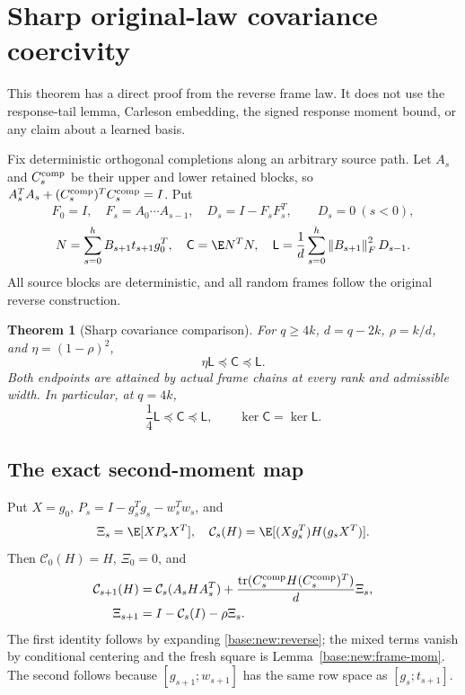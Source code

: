 \documentclass[11pt,oneside,openany,a4paper]{book}
\numberwithin{equation}{chapter}
\newtheorem{theorem}{Theorem}[chapter]
\theoremstyle{definition}
\theoremstyle{remark}
\newcommand{\F}[1]{\left\lVert#1\right\rVert_F}
\DeclareMathOperator{\tr}{tr}\DeclareMathOperator{\rank}{rank}
\newcommand{\Cov}{\mathsf C}\newcommand{\Loss}{\mathsf L}\newcommand{\Fil}{\mathcal F}
\begin{document}
\section{Sharp original-law covariance coercivity}\label{base:new:coercive}
This theorem has a direct proof from the reverse frame law. It does not use the response-tail lemma, Carleson embedding, the signed response moment bound, or any claim about a learned basis.

Fix deterministic orthogonal completions along an arbitrary source path. Let $A_s$ and $C_s^{\rm comp}$ be their upper and lower retained blocks, so
$A_s^TA_s+(C_s^{\rm comp})^TC_s^{\rm comp}=I$. Put
\[
 F_0=I,\quad F_s=A_0\cdots A_{s-1},\quad
 D_s=I-F_sF_s^T,\qquad D_s=0\ (s<0),
\]
\[
 N=\sum_{s=0}^{h}B_{s+1}t_{s+1}g_0^T,\quad
 \Cov=\E N^TN,\quad
 \Loss=\frac1d\sum_{s=0}^{h}\F{B_{s+1}}^2D_{s-1}.
\]
All source blocks are deterministic, and all random frames follow the original reverse construction.

\begin{theorem}[Sharp covariance comparison]\label{base:new:sharp-C}
For $q\ge4k$, $d=q-2k$, $\rho=k/d$, and $\eta=(1-\rho)^2$,
\begin{equation}\label{base:new:sharp-main}
 \boxed{\eta\Loss\preceq\Cov\preceq\Loss.}
\end{equation}
Both endpoints are attained by actual frame chains at every rank and admissible width. In particular, at $q=4k$,
\[
 \frac14\Loss\preceq\Cov\preceq\Loss,\qquad
 \ker\Cov=\ker\Loss.
\]
\end{theorem}

\subsection{The exact second-moment map}
Put $X=g_0$,
$P_s=I-g_s^Tg_s-w_s^Tw_s$, and
\[
 \Xi_s=\E[XP_sX^T],\quad
 \mathcal C_s(H)=\E[(Xg_s^T)H(g_sX^T)].
\]
Then $\mathcal C_0(H)=H$, $\Xi_0=0$, and
\begin{align}
 \mathcal C_{s+1}(H)
 &=\mathcal C_s(A_sHA_s^T)
 +\frac{\tr(C_s^{\rm comp}H(C_s^{\rm comp})^T)}d\Xi_s,
 \label{base:new:Cs}\\
 \Xi_{s+1}&=I-\mathcal C_s(I)-\rho\Xi_s.\label{base:new:Xirec}
\end{align}
The first identity follows by expanding \eqref{base:new:reverse}; the mixed terms vanish by conditional centering and the fresh square is Lemma~\ref{base:new:frame-mom}. The second follows because $[g_{s+1};w_{s+1}]$ has the same row space as $[g_s;t_{s+1}]$.
\end{document}
